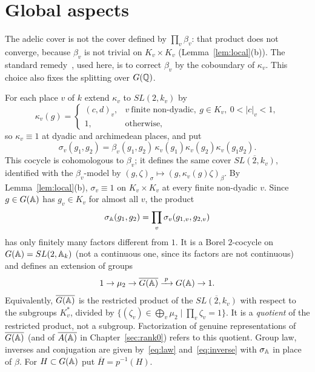 \section{Global aspects}\label{sec:global}

The adelic cover is not the cover defined by $\prod_v\beta_v$: that
product does not converge, because $\beta_v$ is not trivial on
$K_v\times K_v$ (Lemma~\ref{lem:local}(b)). The standard
remedy~\cite{Ku69,Ge76,KP84}, used here, is to correct $\beta_v$ by the
coboundary of $\kappa_v$. This choice also fixes the splitting over
$G(\mathbb{Q})$.

For each place $v$ of $k$ extend $\kappa_v$ to $SL(2,k_v)$ by
\[
\kappa_v(g)=\begin{cases}(c,d)_v,&v\ \text{finite non-dyadic},\ g\in K_v,\
0<|c|_v<1,\\ 1,&\text{otherwise,}\end{cases}
\]
so $\kappa_v\equiv1$ at dyadic and archimedean places, and put
\begin{equation}\label{eq:sigma-v}
\sigma_v(g_1,g_2)=\beta_v(g_1,g_2)\,\kappa_v(g_1)\kappa_v(g_2)\kappa_v(g_1g_2).
\end{equation}
This cocycle is cohomologous to $\beta_v$; it defines the same cover
$\overline{SL(2,k_v)}$, identified with the $\beta_v$-model by
$(g,\zeta)_{\sigma}\mapsto(g,\kappa_v(g)\zeta)_\beta$. By
Lemma~\ref{lem:local}(b), $\sigma_v\equiv1$ on $K_v\times K_v$ at every
finite non-dyadic $v$. Since $g\in G(\mathbb{A})$ has $g_v\in K_v$ for almost all
$v$, the product
\begin{equation}\label{eq:sigma-A}
\sigma_{\mathbb{A}}(g_1,g_2)=\prod_v\sigma_v(g_{1,v},g_{2,v})
\end{equation}
has only finitely many factors different from $1$. It is a Borel
$2$-cocycle on $G(\mathbb{A})=SL(2,\mathbb{A}_k)$ (not a continuous one, since its
factors are not continuous) and defines an extension of groups
\[
1\to\mu_2\to\overline{G(\mathbb{A})}\xrightarrow{\;p\;}G(\mathbb{A})\to1.
\]
Equivalently, $\overline{G(\mathbb{A})}$ is the restricted product of the
$\overline{SL(2,k_v)}$ with respect to the subgroups $K_v^*$, divided by
$\{(\zeta_v)\in\bigoplus_v\mu_2\mid\prod_v\zeta_v=1\}$. It is a
\emph{quotient} of the restricted product, not a subgroup. Factorization
of genuine representations of $\overline{G(\mathbb{A})}$ (and of
$\overline{A(\mathbb{A})}$ in Chapter~\ref{sec:rank0}) refers to this quotient. Group law,
inverses and conjugation are given by~\eqref{eq:law}
and~\eqref{eq:inverse} with $\sigma_{\mathbb{A}}$ in place of $\beta$. For
$H\subset G(\mathbb{A})$ put $\overline H=p^{-1}(H)$.

